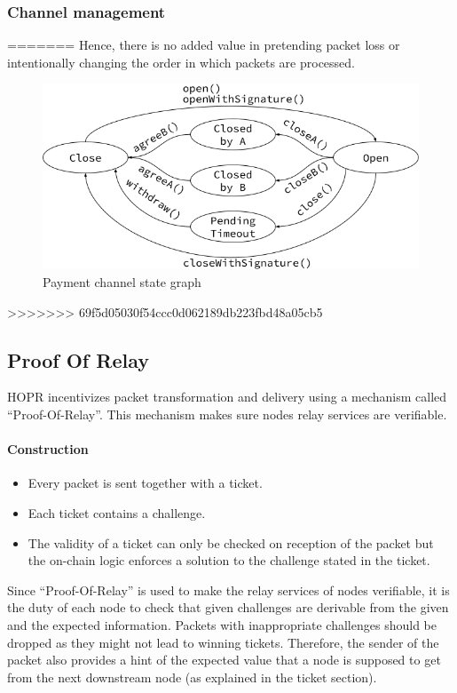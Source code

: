 \subsubsection{Channel management}
=======
Hence, there is no added value in pretending packet loss or intentionally changing the order in which packets are processed.

\begin{figure}[H]
    \centering
    \includegraphics[width=\textwidth,keepaspectratio]{../yellowpaper/images/payment_channel_graph.png}
    \caption{Payment channel state graph}
    \label{fig:Payment channel graph}
\end{figure}

>>>>>>> 69f5d05030f54ccc0d062189db223fbd48a05cb5
\subsection{Proof Of Relay}

HOPR incentivizes packet transformation and delivery using a mechanism called “Proof-Of-Relay”.
This mechanism makes sure nodes relay services are verifiable.
\paragraph{Construction}
\begin{itemize}
    \item Every packet is sent together with a ticket.
    \item Each ticket contains a challenge.
    \item The validity of a ticket can only be checked on reception of the packet but the on-chain logic enforces a solution to the challenge stated in the ticket.
\end{itemize}
Since “Proof-Of-Relay” is used to make the relay services of nodes verifiable, it is the duty of each node to check that given challenges are derivable from the given and the expected information.
Packets with inappropriate challenges should be dropped as they might not lead to winning tickets.
Therefore, the sender of the packet also provides a hint of the expected value that a node is supposed to get from the next downstream node (as explained in the ticket section).










